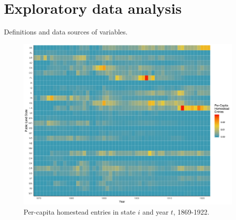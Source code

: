 \documentclass[12pt]{article}
\begin{document}
\maketitle \thispagestyle{empty}
\tableofcontents \thispagestyle{empty}


\pagebreak
{}%

\section{Exploratory data analysis} \label{eda}

\begin{table}[htbp]
	\captionsetup{font=normalsize}
	\caption{Definitions and data sources of variables.\label{dv-table}}
	\begin{center}
	\scalebox{.6}{	}
	\end{center}
\end{table}

\begin{figure}[htbp]
	\begin{center}
		\includegraphics[width=\textwidth]{plots/homestead-heatmap.png}
	\end{center}
	\caption{Per-capita homestead entries in state $i$ and year $t$, 1869-1922. \label{fig:homestead-heatmap}}
\end{figure}
\end{document}
